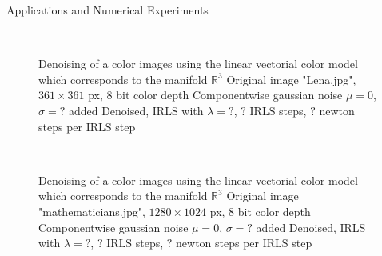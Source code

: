 \begin{chapter}{Applications and Numerical Experiments}
\begin{figure}[h!]
{    }\\
    \caption[Denoising linear vectorial]{Denoising of a color images using the linear vectorial color model which corresponds to the manifold $\mathbb{R}^3$
	 Original image "Lena.jpg", $361\times 361$ px, 8 bit color depth
	 Componentwise gaussian noise $\mu=0$, $\sigma=?$ added
	 Denoised, IRLS with $\lambda=?$, $?$ IRLS steps, $?$ newton steps per IRLS step
	\label{fig:application_color1}
    }
\end{figure}

\begin{figure}[h!]
    \centering
    \\
    \caption[Denoising linear vectorial]{Denoising of a color images using the linear vectorial color model which corresponds to the manifold $\mathbb{R}^3$
	 Original image "mathematicians.jpg", $1280\times 1024$ px, 8 bit color depth
	 Componentwise gaussian noise $\mu=0$, $\sigma=?$ added
	 Denoised, IRLS with $\lambda=?$, $?$ IRLS steps, $?$ newton steps per IRLS step
	\label{fig:application_color2}
    }
\end{figure}



\end{chapter}
